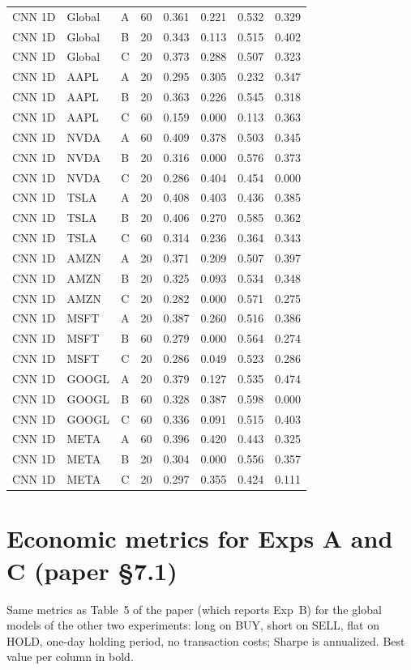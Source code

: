 \documentclass[10pt]{article}
\begin{document}
{\begin{longtable}{@{}l l c c c c c c@{}}
\midrule
CNN 1D & Global & A & 60 & 0.361 & 0.221 & 0.532 & 0.329 \\
CNN 1D & Global & B & 20 & 0.343 & 0.113 & 0.515 & 0.402 \\
CNN 1D & Global & C & 20 & 0.373 & 0.288 & 0.507 & 0.323 \\
CNN 1D & AAPL & A & 20 & 0.295 & 0.305 & 0.232 & 0.347 \\
CNN 1D & AAPL & B & 20 & 0.363 & 0.226 & 0.545 & 0.318 \\
CNN 1D & AAPL & C & 60 & 0.159 & 0.000 & 0.113 & 0.363 \\
CNN 1D & NVDA & A & 60 & 0.409 & 0.378 & 0.503 & 0.345 \\
CNN 1D & NVDA & B & 20 & 0.316 & 0.000 & 0.576 & 0.373 \\
CNN 1D & NVDA & C & 20 & 0.286 & 0.404 & 0.454 & 0.000 \\
CNN 1D & TSLA & A & 20 & 0.408 & 0.403 & 0.436 & 0.385 \\
CNN 1D & TSLA & B & 20 & 0.406 & 0.270 & 0.585 & 0.362 \\
CNN 1D & TSLA & C & 60 & 0.314 & 0.236 & 0.364 & 0.343 \\
CNN 1D & AMZN & A & 20 & 0.371 & 0.209 & 0.507 & 0.397 \\
CNN 1D & AMZN & B & 20 & 0.325 & 0.093 & 0.534 & 0.348 \\
CNN 1D & AMZN & C & 20 & 0.282 & 0.000 & 0.571 & 0.275 \\
CNN 1D & MSFT & A & 20 & 0.387 & 0.260 & 0.516 & 0.386 \\
CNN 1D & MSFT & B & 60 & 0.279 & 0.000 & 0.564 & 0.274 \\
CNN 1D & MSFT & C & 20 & 0.286 & 0.049 & 0.523 & 0.286 \\
CNN 1D & GOOGL & A & 20 & 0.379 & 0.127 & 0.535 & 0.474 \\
CNN 1D & GOOGL & B & 60 & 0.328 & 0.387 & 0.598 & 0.000 \\
CNN 1D & GOOGL & C & 60 & 0.336 & 0.091 & 0.515 & 0.403 \\
CNN 1D & META & A & 60 & 0.396 & 0.420 & 0.443 & 0.325 \\
CNN 1D & META & B & 20 & 0.304 & 0.000 & 0.556 & 0.357 \\
CNN 1D & META & C & 20 & 0.297 & 0.355 & 0.424 & 0.111 \\
\end{longtable}}

\section{Economic metrics for Exps A and C (paper \S7.1)}
Same metrics as Table~5 of the paper (which reports Exp~B) for the global models of the other two
experiments: long on BUY, short on SELL, flat on HOLD, one-day holding period, no transaction
costs; Sharpe is annualized. Best value per column in bold.
\end{document}
